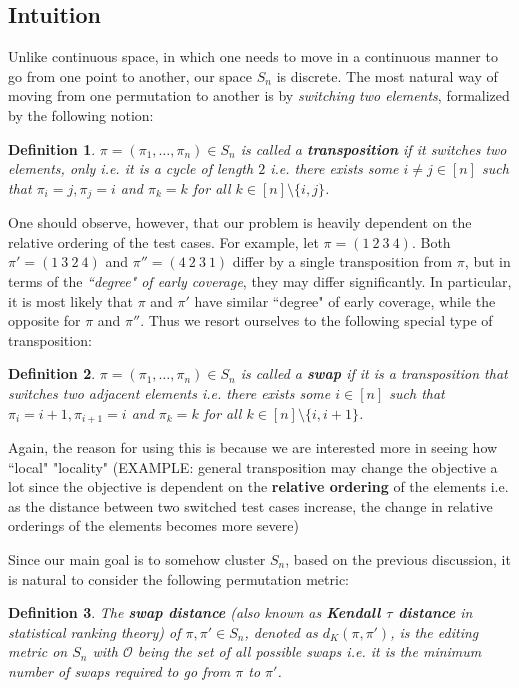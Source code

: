 \documentclass[10pt,journal,compsoc]{IEEEtran}
\newtheorem{definition}{Definition}[section]
\begin{document}
	\subsection{Intuition}
	Unlike continuous space, in which one needs to move in a continuous manner to go from one point to another, our space $S_n$ is discrete.
	The most natural way of moving from one permutation to another is by {\it switching two elements}, formalized by the following notion:
	\begin{definition}
		$\pi = (\pi_1, \dots, \pi_n) \in S_n$ is called a {\bf transposition} if it switches two elements, only i.e. it is a cycle of length $2$ i.e. there exists some $i \not= j \in [n]$ such that $\pi_i = j, \pi_j = i$ and $\pi_k = k$ for all $k \in [n] \setminus \{i, j\}$.
	\end{definition}
	
	One should observe, however, that our problem is heavily dependent on the relative ordering of the test cases.
	For example, let $\pi = (1 \ 2 \ 3 \ 4)$.
	Both $\pi' = (1 \ 3 \ 2 \ 4)$ and $\pi'' = (4 \ 2 \ 3 \ 1)$ differ by a single transposition from $\pi$, but in terms of the {\it ``degree" of early coverage}, they may differ significantly.
	In particular, it is most likely that $\pi$ and $\pi'$ have similar ``degree" of early coverage, while the opposite for $\pi$ and $\pi''$.
	Thus we resort ourselves to the following special type of transposition:
	\begin{definition}
		$\pi = (\pi_1, \dots, \pi_n) \in S_n$ is called a {\bf swap} if it is a transposition that switches two adjacent elements i.e. there exists some $i \in [n]$ such that $\pi_i = i+1, \pi_{i+1} = i$ and $\pi_k = k$ for all $k \in [n] \setminus \{i, i+1\}$.
	\end{definition}
	
	Again, the reason for using this is because we are interested more in seeing how ``local"  "locality"
	(EXAMPLE: general transposition may change the objective a lot since the objective is dependent on the {\bf relative ordering} of the elements i.e. as the distance between two switched test cases increase, the change in relative orderings of the elements becomes more severe)
	
	Since our main goal is to somehow cluster $S_n$, based on the previous discussion, it is natural to  consider the following permutation metric:
	\begin{definition}
		The {\bf swap distance} (also known as {\bf Kendall $\tau$ distance} in statistical ranking theory) of $\pi, \pi' \in S_n$, denoted as $d_K(\pi, \pi')$, is the editing metric on $S_n$ with $\mathcal{O}$ being the set of all possible swaps i.e. it is the minimum number of swaps required to go from $\pi$ to $\pi'$.
	\end{definition}
	
\end{document}
